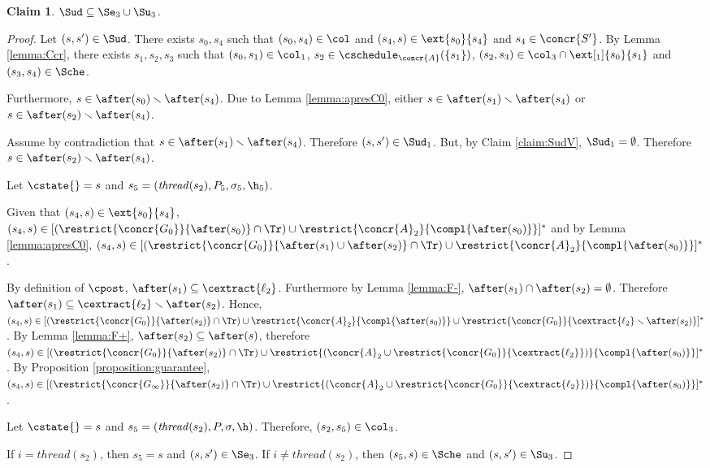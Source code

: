 \documentclass[12pt]{article}
\let\vide\emptyset \let\appartient\in
\let\firstunion\cup
\let\firstinter\cap
\let\emptyset\vide \let\in\appartient
\let\cup\firstunion
\let\cap\firstinter
\renewcommand{\subset}{\subseteq}
\newcommand{\thread}{\mathit{thread}}
\newtheorem{claim}{Claim}
\begin{document}
\begin{claim}
 \(\Sud\subset\Se_3\cup\Su_3\).
\end{claim}
\begin{proof}
 Let \((s,s')\in \Sud\). There exists \(s_0,s_4\) such that \((s_0,s_4)\in\col\) and \((s_4,s)\in\ext{s_0}{s_4}\) and \(s_4\in\concr{S'}\).
 By Lemma \ref{lemma:Ccr}, there exists \(s_1,s_2,s_3\) such that \((s_0,s_1)\in\col_1\), \(s_2\in\cschedule_{\concr{A}}(\{s_1\})\), \((s_2,s_3)\in \col_3\cap\ext[_1]{s_0}{s_1}\) and \((s_3,s_4)\in\Sche\).
  
Furthermore, \(s\in\after(s_0)\smallsetminus\after(s_4)\). Due to Lemma \ref{lemma:apresC0}, either
 \(s\in\after(s_1)\smallsetminus\after(s_4)\) or \(s\in\after(s_2) \smallsetminus\after(s_4)\).

Assume by contradiction that \(s\in\after(s_1)\smallsetminus\after(s_4)\). Therefore \((s,s')\in \Sud_1\). But, by Claim \ref{claim:SudV}, \(\Sud_1=\emptyset\).
Therefore \(s\in\after(s_2) \smallsetminus\after(s_4)\).

Let \(\cstate{}=s\) and \(s_{5}=(\thread(s_2),P_5,\m_5,\h_5)\).


Given that \((s_4,s)\in\ext{s_0}{s_4}\), \((s_4,s)\in[(\restrict{\concr{G_0}}{\after(s_0)}\cap\Tr)\cup\restrict{{\concr{A}_2}}{\compl{\after(s_0)}}]^{\ast}\) and by Lemma \ref{lemma:apresC0}, \((s_4,s)\in[(\restrict{\concr{G_0}}{\after(s_1)\cup\after(s_2)}\cap\Tr)\cup\restrict{{\concr{A}_2}}{\compl{\after(s_0)}}]^{\ast}\).

By definition of \(\cpost\), \(\after(s_1)\subset\cextract{\ell_2}\). Furthermore by Lemma \ref{lemma:F-}, \(\after(s_1)\cap\after(s_2)=\emptyset\). Therefore \(\after(s_1)\subset\cextract{\ell_2}\smallsetminus\after(s_2)\).
Hence, \((s_4,s)\in [(\restrict{\concr{G_0}}{\after(s_2)}\cap\Tr)\cup\restrict{{\concr{A}_2}}{\compl{\after(s_0)}}\cup\restrict{\concr{G_0}}{\cextract{\ell_2}\smallsetminus\after(s_2)}]^{\ast}\).
By Lemma \ref{lemma:F+}, \(\after(s_2)\subset\after(s)\), therefore \((s_4,s)\in [(\restrict{\concr{G_0}}{\after(s_2)}\cap\Tr)\cup\restrict{({\concr{A}_2}\cup\restrict{\concr{G_0}}{\cextract{\ell_2}})}{\compl{\after(s_0)}}]^{\ast}\).
By Proposition \ref{proposition:guarantee}, \((s_4,s)\in [(\restrict{\concr{G_\infty}}{\after(s_2)}\cap\Tr)\cup\restrict{({\concr{A}_2}\cup\restrict{\concr{G_0}}{\cextract{\ell_2}})}{\compl{\after(s_0)}}]^{\ast}\).

Let \(\cstate{}=s\) and \(s_{5}=(\thread(s_2),P,\m,\h)\).
Therefore, \((s_2,s_5)\in\col_3\).

If \(i=\thread(s_2)\), then \(s_5=s\) and  \((s,s')\in\Se_3\).
If \(i\neq\thread(s_2)\), then \((s_5,s)\in\Sche\) and \((s,s')\in\Su_3\).
\end{proof}
 
\end{document}
